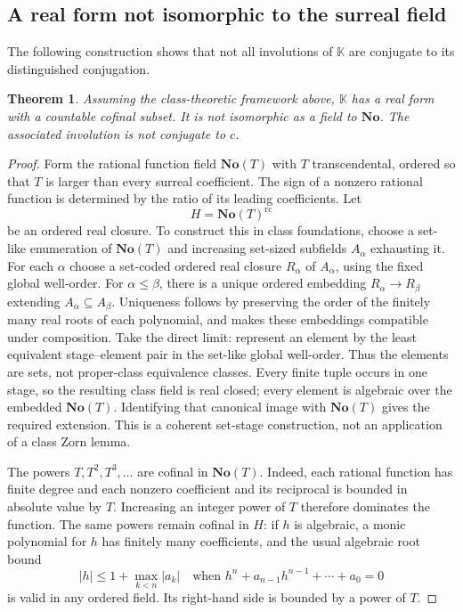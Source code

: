 \documentclass[11pt]{article}
\newtheorem{theorem}{Theorem}[section]
\theoremstyle{definition}
\theoremstyle{remark}
\newcommand{\No}{\mathbf{No}}
\newcommand{\K}{\mathbb K}
\newcommand{\rc}{\operatorname{rc}}
\numberwithin{equation}{section}
\begin{document}
\subsection{A real form not isomorphic to the surreal field}

The following construction shows that not all involutions of $\K$ are
conjugate to its distinguished conjugation.

\begin{theorem}\label{saut:thm:inequivalentrealform}
Assuming the class-theoretic framework above, $\K$ has a real form with a
countable cofinal subset. It is not isomorphic as a field to $\No$.
The associated involution is not conjugate to $c$.
\end{theorem}
\begin{proof}
Form the rational function field $\No(T)$ with $T$ transcendental, ordered
so that $T$ is larger than every surreal coefficient. The sign of a
nonzero rational function is determined by the ratio of its leading
coefficients. Let
\[
 H=\No(T)^{\rc}
\]
be an ordered real closure. To construct this in class foundations,
choose a set-like enumeration of $\No(T)$ and increasing set-sized subfields
$A_\alpha$ exhausting it. For each $\alpha$ choose a set-coded ordered real
closure $R_\alpha$ of $A_\alpha$, using the fixed global well-order.
For $\alpha\le\beta$, there is a unique ordered embedding
$R_\alpha\to R_\beta$ extending $A_\alpha\subseteq A_\beta$.
Uniqueness follows by preserving the order of the finitely many real roots
of each polynomial, and makes these embeddings compatible under composition.
Take the direct limit: represent an element by the least equivalent
stage--element pair in the set-like global well-order. Thus the elements
are sets, not proper-class equivalence classes. Every finite tuple occurs
in one stage, so the resulting class field is real closed; every element
is algebraic over the embedded $\No(T)$. Identifying that canonical image
with $\No(T)$ gives the required extension. This is a coherent set-stage
construction, not an application of a class Zorn lemma.

The powers $T,T^2,T^3,\ldots$ are cofinal in $\No(T)$. Indeed, each rational
function has finite degree and each nonzero coefficient and its reciprocal
is bounded in absolute value by $T$. Increasing an integer power of $T$
therefore dominates the function. The same powers remain cofinal in $H$:
if $h$ is algebraic, a monic polynomial for $h$ has finitely many
coefficients, and the usual algebraic root bound
\[
 |h|\le 1+\max_{k<n}|a_k|
 \quad\text{when }h^n+a_{n-1}h^{n-1}+\cdots+a_0=0
\]
is valid in any ordered field. Its right-hand side is bounded by a power
of $T$.


\end{proof}
\end{document}
